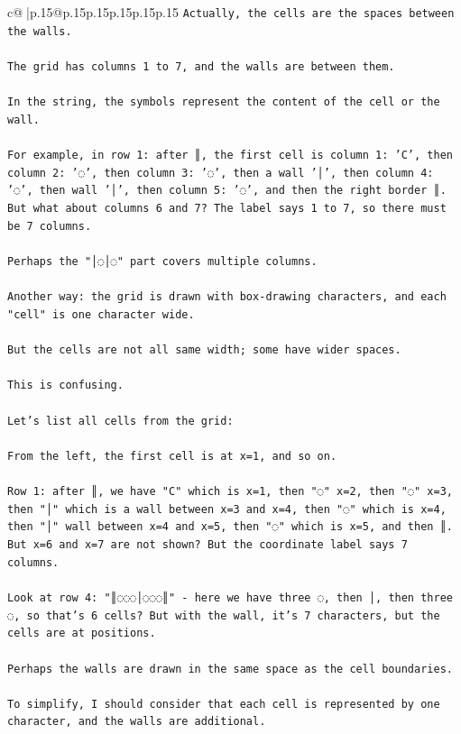 \documentclass{article}
\begin{document}
{\begin{supertabular}{c@{$\;$}|p{.15\linewidth}@{}p{.15\linewidth}p{.15\linewidth}p{.15\linewidth}p{.15\linewidth}p{.15\linewidth}}
{{{\texttt{Actually, the cells are the spaces between the walls.} \\
\\ 
\texttt{The grid has columns 1 to 7, and the walls are between them.} \\
\\ 
\texttt{In the string, the symbols represent the content of the cell or the wall.} \\
\\ 
\texttt{For example, in row 1: after ║, the first cell is column 1: 'C', then column 2: '◌', then column 3: '◌', then a wall '│', then column 4: '◌', then wall '│', then column 5: '◌', and then the right border ║. But what about columns 6 and 7? The label says 1 to 7, so there must be 7 columns.} \\
\\ 
\texttt{Perhaps the "│◌│◌" part covers multiple columns.} \\
\\ 
\texttt{Another way: the grid is drawn with box{-}drawing characters, and each "cell" is one character wide.} \\
\\ 
\texttt{But the cells are not all same width; some have wider spaces.} \\
\\ 
\texttt{This is confusing.} \\
\\ 
\texttt{Let's list all cells from the grid:} \\
\\ 
\texttt{From the left, the first cell is at x=1, and so on.} \\
\\ 
\texttt{Row 1: after ║, we have "C" which is x=1, then "◌" x=2, then "◌" x=3, then "│" which is a wall between x=3 and x=4, then "◌" which is x=4, then "│" wall between x=4 and x=5, then "◌" which is x=5, and then ║. But x=6 and x=7 are not shown? But the coordinate label says 7 columns.} \\
\\ 
\texttt{Look at row 4: "║◌◌◌│◌◌◌║" {-} here we have three ◌, then │, then three ◌, so that's 6 cells? But with the wall, it's 7 characters, but the cells are at positions.} \\
\\ 
\texttt{Perhaps the walls are drawn in the same space as the cell boundaries.} \\
\\ 
\texttt{To simplify, I should consider that each cell is represented by one character, and the walls are additional.} \\
}}}
\end{supertabular}}
\end{document}
